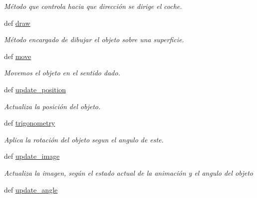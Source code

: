 \begin{DoxyCompactItemize}
\begin{DoxyCompactList}\small\item\em \-Método que controla hacia que dirección se dirige el coche. \end{DoxyCompactList}\item 
def \hyperlink{classengine_1_1gameobject_1_1GameObject_a576c76eafa707e0d3ac394036e16f2e3}{draw}
\begin{DoxyCompactList}\small\item\em \-Método encargado de dibujar el objeto sobre una superficie. \end{DoxyCompactList}\item 
def \hyperlink{classengine_1_1gameobject_1_1GameObject_ad7d38b76b223786e8358091c19e45533}{move}
\begin{DoxyCompactList}\small\item\em \-Movemos el objeto en el sentido dado. \end{DoxyCompactList}\item 
\hypertarget{classengine_1_1gameobject_1_1GameObject_abdb82c732c300a8be4b0c332ec581830}{
def \hyperlink{classengine_1_1gameobject_1_1GameObject_abdb82c732c300a8be4b0c332ec581830}{update\-\_\-position}}
\label{classengine_1_1gameobject_1_1GameObject_abdb82c732c300a8be4b0c332ec581830}

\begin{DoxyCompactList}\small\item\em \-Actualiza la posición del objeto. \end{DoxyCompactList}\item 
\hypertarget{classengine_1_1gameobject_1_1GameObject_a95945d1a9addcfb295d5563e71f8b0fe}{
def \hyperlink{classengine_1_1gameobject_1_1GameObject_a95945d1a9addcfb295d5563e71f8b0fe}{trigonometry}}
\label{classengine_1_1gameobject_1_1GameObject_a95945d1a9addcfb295d5563e71f8b0fe}

\begin{DoxyCompactList}\small\item\em \-Aplica la rotación del objeto segun el angulo de este. \end{DoxyCompactList}\item 
\hypertarget{classengine_1_1gameobject_1_1GameObject_a824b61f0453f1dba7a04c74f4f7537e4}{
def \hyperlink{classengine_1_1gameobject_1_1GameObject_a824b61f0453f1dba7a04c74f4f7537e4}{update\-\_\-image}}
\label{classengine_1_1gameobject_1_1GameObject_a824b61f0453f1dba7a04c74f4f7537e4}

\begin{DoxyCompactList}\small\item\em \-Actualiza la imagen, según el estado actual de la animación y el angulo del objeto \end{DoxyCompactList}\item 
\hypertarget{classengine_1_1gameobject_1_1GameObject_a68e179bc4349a3b5b9735fe73721ae50}{
def \hyperlink{classengine_1_1gameobject_1_1GameObject_a68e179bc4349a3b5b9735fe73721ae50}{update\-\_\-angle}}
\label{classengine_1_1gameobject_1_1GameObject_a68e179bc4349a3b5b9735fe73721ae50}


\end{DoxyCompactItemize}
